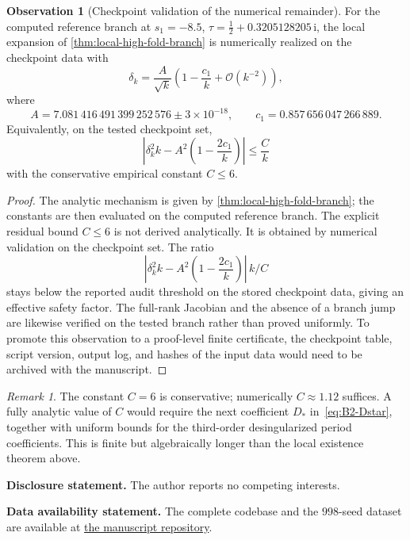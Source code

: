 \documentclass[11pt,a4paper]{article}
\theoremstyle{plain}
\theoremstyle{definition}
\newtheorem{observation}[theorem]{Observation}
\theoremstyle{remark}
\newtheorem{remark}[theorem]{Remark}
\newcommand{\ii}{\mathrm{i}}
\newcommand{\Oo}{\mathcal{O}}
\begin{document}
\begin{observation}[Checkpoint validation of the numerical remainder]
\label{obs:rigorous-asymp}
\label{prop:rigorous-asymp}
For the computed reference branch at
$s_1=-8.5$, $\tau=\tfrac12+0.3205128205\,\ii$, the local expansion of
\cref{thm:local-high-fold-branch} is numerically realized on the
checkpoint data with
\begin{equation}\label{eq:rigorous-asymp}
  \delta_k
  =
  \frac{A}{\sqrt{k}}
  \left(1-\frac{c_1}{k}+\Oo(k^{-2})\right),
\end{equation}
where
\[
  A=7.081\,416\,491\,399\,252\,576\pm3\times10^{-18},
  \qquad
  c_1=0.857\,656\,047\,266\,889 .
\]
Equivalently, on the tested checkpoint set,
\[
  \left|\delta_k^2 k-A^2\left(1-\frac{2c_1}{k}\right)\right|
  \le \frac{C}{k}
\]
with the conservative empirical constant $C\le6$.
\end{observation}

\begin{proof}
The analytic mechanism is given by
\cref{thm:local-high-fold-branch}; the constants are then evaluated on
the computed reference branch.  The explicit residual bound $C\le6$ is
not derived analytically.  It is obtained by numerical validation on
the checkpoint set.  The ratio
\[
  \left|\delta_k^2 k-A^2\left(1-\frac{2c_1}{k}\right)\right|\,k/C
\]
stays below the reported audit threshold on the stored checkpoint data,
giving an effective safety factor.  The full-rank Jacobian and the
absence of a branch jump are likewise verified on the tested branch
rather than proved uniformly.  To promote this observation to a
proof-level finite certificate, the checkpoint table, script version,
output log, and hashes of the input data would need to be archived with
the manuscript.
\end{proof}

\begin{remark}
The constant $C=6$ is conservative; numerically $C\approx1.12$ suffices.
A fully analytic value of $C$ would require the next coefficient
$D_*$ in~\eqref{eq:B2-Dstar}, together with uniform bounds for the
third-order desingularized period coefficients.  This is finite but
algebraically longer than the local existence theorem above.
\end{remark}

\bigskip
\noindent\textbf{Disclosure statement.}
The author reports no competing interests.

\smallskip
\noindent\textbf{Data availability statement.}
The complete codebase and the $998$-seed dataset are available at
\href{https://github.com/aconsciousfractal/Compact-Bonnet-Pairs-for-k-fold-Tori}{the manuscript repository}.
\end{document}
